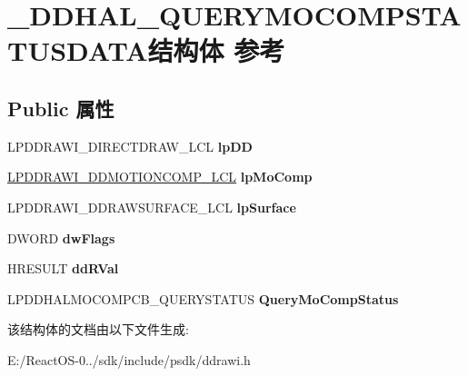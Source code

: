 \hypertarget{struct___d_d_h_a_l___q_u_e_r_y_m_o_c_o_m_p_s_t_a_t_u_s_d_a_t_a}{}\section{\+\_\+\+D\+D\+H\+A\+L\+\_\+\+Q\+U\+E\+R\+Y\+M\+O\+C\+O\+M\+P\+S\+T\+A\+T\+U\+S\+D\+A\+T\+A结构体 参考}
\label{struct___d_d_h_a_l___q_u_e_r_y_m_o_c_o_m_p_s_t_a_t_u_s_d_a_t_a}
\subsection*{Public 属性}
\begin{DoxyCompactItemize}
\item 
\mbox{\label{struct___d_d_h_a_l___q_u_e_r_y_m_o_c_o_m_p_s_t_a_t_u_s_d_a_t_a_a3054a2311f60fa107283ec37600645fe}} 
L\+P\+D\+D\+R\+A\+W\+I\+\_\+\+D\+I\+R\+E\+C\+T\+D\+R\+A\+W\+\_\+\+L\+CL {\bfseries lp\+DD}
\item 
\mbox{\label{struct___d_d_h_a_l___q_u_e_r_y_m_o_c_o_m_p_s_t_a_t_u_s_d_a_t_a_aa7d5925add01ad2d22692ac96f8c1553}} 
\hyperlink{struct___d_d_r_a_w_i___d_d_m_o_t_i_o_n_c_o_m_p___l_c_l}{L\+P\+D\+D\+R\+A\+W\+I\+\_\+\+D\+D\+M\+O\+T\+I\+O\+N\+C\+O\+M\+P\+\_\+\+L\+CL} {\bfseries lp\+Mo\+Comp}
\item 
\mbox{\label{struct___d_d_h_a_l___q_u_e_r_y_m_o_c_o_m_p_s_t_a_t_u_s_d_a_t_a_ac3e1e319fb6e1c91d7f4597f5fdce193}} 
L\+P\+D\+D\+R\+A\+W\+I\+\_\+\+D\+D\+R\+A\+W\+S\+U\+R\+F\+A\+C\+E\+\_\+\+L\+CL {\bfseries lp\+Surface}
\item 
\mbox{\label{struct___d_d_h_a_l___q_u_e_r_y_m_o_c_o_m_p_s_t_a_t_u_s_d_a_t_a_ac6798e6f3b8044e2e0206306f5061c24}} 
D\+W\+O\+RD {\bfseries dw\+Flags}
\item 
\mbox{\label{struct___d_d_h_a_l___q_u_e_r_y_m_o_c_o_m_p_s_t_a_t_u_s_d_a_t_a_afbe6bb4b8cf64b522ac84960c5fecb06}} 
H\+R\+E\+S\+U\+LT {\bfseries dd\+R\+Val}
\item 
\mbox{\label{struct___d_d_h_a_l___q_u_e_r_y_m_o_c_o_m_p_s_t_a_t_u_s_d_a_t_a_adaa11e6e91557e75a47ddcad28ba9d12}} 
L\+P\+D\+D\+H\+A\+L\+M\+O\+C\+O\+M\+P\+C\+B\+\_\+\+Q\+U\+E\+R\+Y\+S\+T\+A\+T\+US {\bfseries Query\+Mo\+Comp\+Status}
\end{DoxyCompactItemize}


该结构体的文档由以下文件生成\+:\begin{DoxyCompactItemize}
\item 
E\+:/\+React\+O\+S-\/0../sdk/include/psdk/ddrawi.\+h\end{DoxyCompactItemize}

